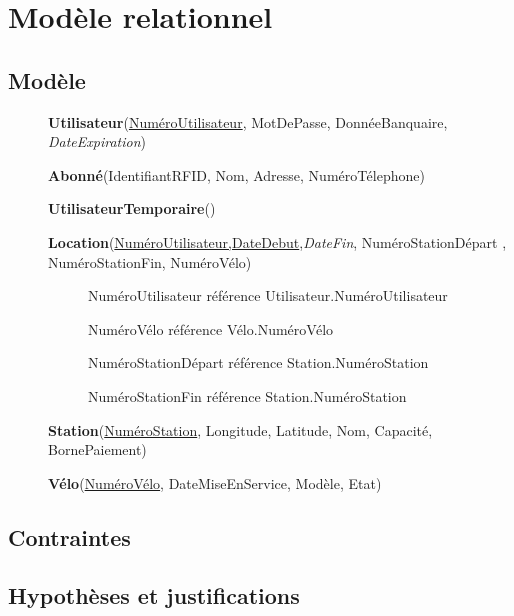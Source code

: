 \documentclass[a4paper,10pt]{report}
\begin{document}
\chapter{Modèle relationnel}
\section{Modèle}

\begin{description}
\item[] \textbf{Utilisateur}(\underline{NuméroUtilisateur}, MotDePasse, DonnéeBanquaire, \textit{DateExpiration})

\item[] \textbf{Abonné}(IdentifiantRFID, Nom, Adresse, NuméroTélephone)

\item[] \textbf{UtilisateurTemporaire}()

\item[] \textbf{Location}(\underline{NuméroUtilisateur,DateDebut},\textit{DateFin}, NuméroStationDépart , NuméroStationFin, NuméroVélo) %
	\begin{description}
	\item[] NuméroUtilisateur référence Utilisateur.NuméroUtilisateur
	\item[] NuméroVélo référence Vélo.NuméroVélo
	\item[] NuméroStationDépart référence Station.NuméroStation
	\item[] NuméroStationFin référence Station.NuméroStation
	\end{description}
	
\item[] \textbf{Station}(\underline{NuméroStation}, Longitude, Latitude, Nom, Capacité, BornePaiement)

 \item[] \textbf{Vélo}(\underline{NuméroVélo}, DateMiseEnService, Modèle, Etat)

\end{description}

\section{Contraintes}
\section{Hypothèses et justifications}
\end{document}
